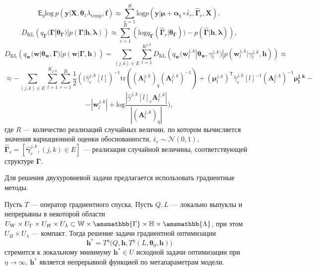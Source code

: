 \[
   \mathsf{E}_q \text{log}~p(\mathbf{y}|\mathbf{X}, \boldsymbol{\theta}_1 \lambda_{\text{temp}}, \mathbf{f}) \approx   \sum_{r=1}^R \text{log}p(\mathbf{y}|\boldsymbol{\mu}+\boldsymbol{\alpha}_q \circ \hat{\epsilon}_r, \hat{\boldsymbol{\Gamma}}_r, \mathbf{X}),
\]
\[
D_\text{KL}\left(q_{\boldsymbol{\Gamma}}(\boldsymbol{\Gamma}|\boldsymbol{\theta}_{\boldsymbol{\Gamma}})|p(\boldsymbol{\Gamma}|\mathbf{h}, \boldsymbol{\lambda})\right)   \approx  \sum_{r=1}^R \left(\text{log}q_{\boldsymbol{\Gamma}}(\hat{\boldsymbol{\Gamma}}_r|\boldsymbol{\theta}_{\boldsymbol{\Gamma}}))-p(\hat{\boldsymbol{\Gamma}}|\mathbf{h},\boldsymbol{\lambda})\right),
\]
\[
D_\text{KL}\left(q_{\mathbf{w}}(\mathbf{w}|\boldsymbol{\theta}_\mathbf{w},\boldsymbol{\Gamma})|p(\mathbf{w}|\boldsymbol{\Gamma}, \mathbf{h})\right)  =  \sum_{(j,k) \in E}\sum_{l=1}^{K^{j,k}} D_\text{KL}\left(q_{\mathbf{w}}(\mathbf{w}^{j,k}_l|\boldsymbol{\theta}_\mathbf{w},\gamma^{j,k}_l)|p(\mathbf{w}^{j,k}_l|\gamma^{j,k}_l, \mathbf{h})\right)\approx
\]
\[ 
\approx-\sum_{(j,k) \in E}\sum_{l=1}^{K_{j,k}}\sum_{r=1}^R\frac{1}{2}\left( (\hat{\gamma}^{j,k}_r[l]\right)^{-1}\text{tr}((\mathbf{A}^{j,k}_l)_q(\mathbf{A}^{j,k}_l)^{-1})+(\boldsymbol{\mu}^{j,k}_l)^{\mathsf{T}}\hat{\gamma}^{j,k}_r[l]^{-1}(\mathbf{A}^{j,k}_l)^{-1}\boldsymbol{\mu^{j,k}_l} -
\]
\[
- |\mathbf{w}^{j,k}_l|+\text{log}\frac{|\hat{\gamma}^{j,k}[l]_r\mathbf{A}^{j,k}_l|}{|(\mathbf{A}^{j,k}_l)_q|}),
\]
где $R$ --- количество реализаций случайных величин, по котором вычисляется значения вариационной оценки обоснованности, $\hat{\epsilon}_r \sim \mathcal{N}(0,1),$
 $\hat{\boldsymbol{\Gamma}}_r = [\hat{\boldsymbol{\gamma}}^{j,k}_r, (j,k) \in E]$ --- реализация случайной величины, соответствующей структуре $\boldsymbol{\Gamma}$.

Для решения двухуровневой задачи предлагается использовать градиентные методы. 
\begin{theorem}
Пусть $T$ --- оператор градиентного спуска.
Пусть $Q,L$ --- локально выпуклы и непрерывны в некоторой области $U_{W} \times U_{\Gamma} \times U_H \times U_\lambda \subset \mathbb{W}\times\amsmathbb{\Gamma}\times\mathbb{H}\times\amsmathbb{\Lambda}$, при  этом $U_H \times U_\lambda$ --- компакт. 
Тогда решение задачи градиентной оптимизации 
\[
     \mathbf{h}^{*} = T^\eta\bigl(Q, \mathbf{h}, T^\eta(L, \boldsymbol{\theta}_0, \mathbf{h})\bigr)
\] 
стремится к локальному минимуму  $\mathbf{h}^{*} \in U$ исходной задачи оптимизации при $\eta \to \infty$,
$\mathbf{h}^{*}$ является непрерывной функцией по метапараметрам модели.
\end{theorem}

